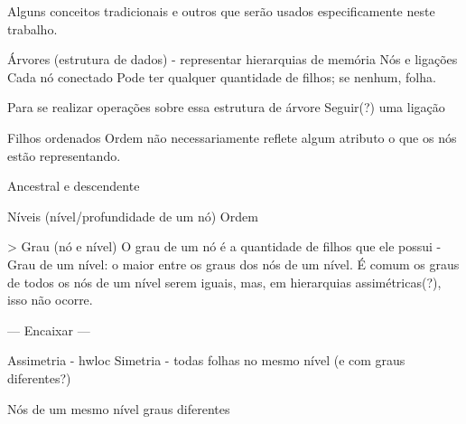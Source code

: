 

Alguns conceitos tradicionais e outros que serão usados especificamente neste trabalho.

Árvores (estrutura de dados) - representar hierarquias de memória
Nós e ligações
Cada nó conectado 
Pode ter qualquer quantidade de filhos; se nenhum, folha.

Para se realizar operações sobre essa estrutura de árvore
Seguir(?) uma ligação

Filhos ordenados
Ordem não necessariamente reflete algum atributo  o que os nós estão representando.

Ancestral e descendente

Níveis (nível/profundidade de um nó)
Ordem

> Grau (nó e nível)
O grau de um nó é a quantidade de filhos que ele possui
- Grau de um nível: o maior entre os graus dos nós de um nível.
É comum os graus de todos os nós de um nível serem iguais, mas, em hierarquias assimétricas(?), isso não ocorre.


--- Encaixar ---

Assimetria - hwloc
Simetria - todas folhas no mesmo nível (e com graus diferentes?)

Nós de um mesmo nível  graus diferentes